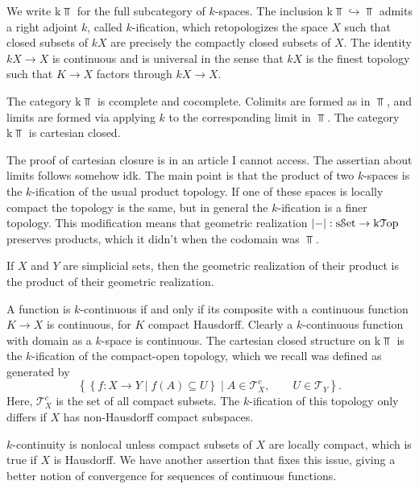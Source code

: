 We write $\mathrm{k} \Top $ for the full subcategory of $k$-spaces. The inclusion $\mathrm{k} \Top \hookrightarrow \Top $ admits a right adjoint $k$, called $k$-ification, which retopologizes the space $X$ such that closed subsets of $kX$ are precisely the compactly closed subsets of $X$. The identity $kX\to X$ is continuous and is universal in the sense that $kX$ is the finest topology such that $K\to X$ factors through $kX\to X$.

\begin{theorem}\label{thm:6.2}
	The category $\mathrm{k} \Top $ is ccomplete and cocomplete. Colimits are formed as in $\Top $, and limits are formed via applying $k$ to the corresponding limit in $\Top $. The category $\mathrm{k} \Top $ is cartesian closed.
\end{theorem}

The proof of cartesian closure is in an article I cannot access. The assertian about limits follows somehow idk. The main point is that the product of two $k$-spaces is the $k$-ification of the usual product topology. If one of these spaces is locally compact the topology is the same, but in general the $k$-ification is a finer topology. This modification means that geometric realization $\left| - \right| : \mathrm{s}\mathcal{S}\mathrm{et} \to \mathrm{k} \mathcal{T}\mathrm{op} $ preserves products, which it didn't when the codomain was $\Top $.

\begin{lemma}\label{lma:6.2}
	If $X$ and $Y$ are simplicial sets, then the geometric realization of their product is the product of their geometric realization.
\end{lemma}

A function is $k$-continuous if and only if its composite with a continuous function $K\to X$ is continuous, for $K$ compact Hausdorff. Clearly a $k$-continuous function with domain as a $k$-space is continuous. The cartesian closed structure on $\mathrm{k} \Top $ is the $k$-ification of the compact-open topology, which we recall was defined as generated by
\[
	\left\{ \left\{ f : X \to Y\mid f(A)\subseteq U \right\} \mid A\in \mathcal{T}_X^{c} ,\qquad U\in \mathcal{T} _Y \right\} 
.\]
Here, $\mathcal{T} _X^{c} $ is the set of all compact subsets. The $k$-ification of this topology only differs if $X$ has non-Hausdorff compact subspaces.

$k$-continuity is nonlocal unless compact subsets of $X$ are locally compact, which is true if $X$ is Hausdorff. We have another assertion that fixes this issue, giving a better notion of convergence for sequences of continuous functions.

